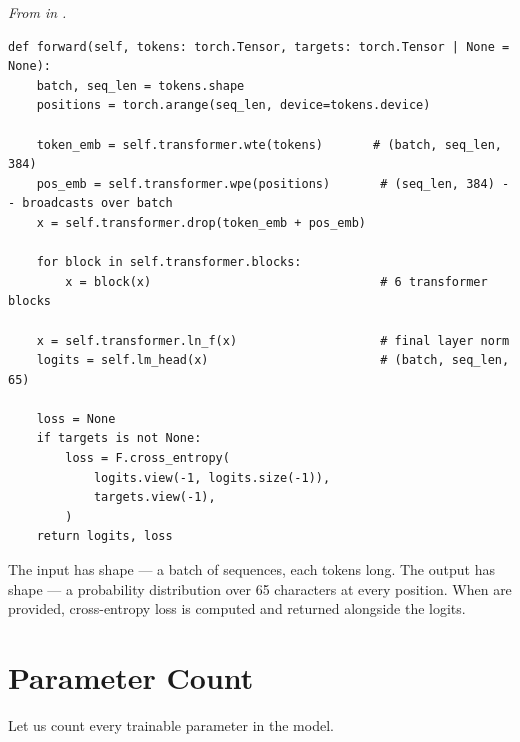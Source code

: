 \concepttag
{\small\itshape From  in .}
\begin{lstlisting}
def forward(self, tokens: torch.Tensor, targets: torch.Tensor | None = None):
    batch, seq_len = tokens.shape
    positions = torch.arange(seq_len, device=tokens.device)

    token_emb = self.transformer.wte(tokens)       # (batch, seq_len, 384)
    pos_emb = self.transformer.wpe(positions)       # (seq_len, 384) -- broadcasts over batch
    x = self.transformer.drop(token_emb + pos_emb)

    for block in self.transformer.blocks:
        x = block(x)                                # 6 transformer blocks

    x = self.transformer.ln_f(x)                    # final layer norm
    logits = self.lm_head(x)                        # (batch, seq_len, 65)

    loss = None
    if targets is not None:
        loss = F.cross_entropy(
            logits.view(-1, logits.size(-1)),
            targets.view(-1),
        )
    return logits, loss
\end{lstlisting}

The input  has shape  --- a batch of sequences, each  tokens long. The output  has shape  --- a probability distribution over 65 characters at every position. When  are provided, cross-entropy loss is computed and returned alongside the logits.


\section{Parameter Count}

Let us count every trainable parameter in the model.

